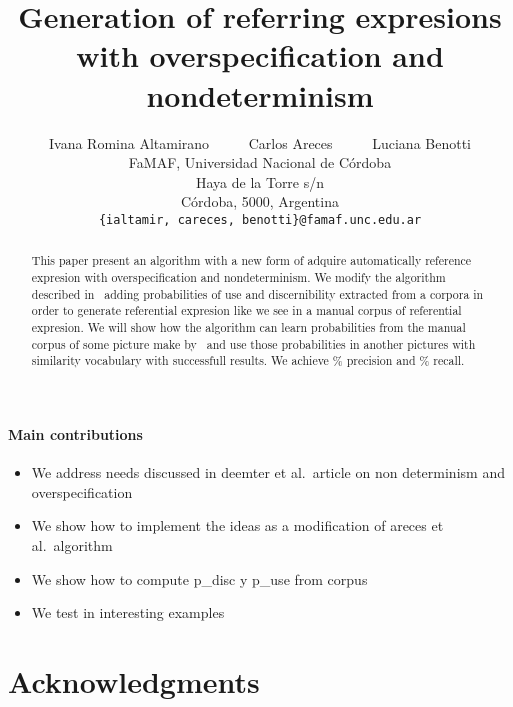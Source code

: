 \documentclass[11pt,letterpaper]{article}
\title{Generation of referring expresions with overspecification and nondeterminism}
\author{Ivana Romina Altamirano 
	  \ \ \ \ \ 
	Carlos Areces
	  \ \ \ \ \ 
	Luciana Benotti\\
	    FaMAF, Universidad Nacional de C\'ordoba\\
	    Haya de la Torre s/n\\
	    C\'ordoba, 5000, Argentina\\
	    	    {\tt \{ialtamir, careces, benotti\}@famaf.unc.edu.ar}	    }
\date{}
\newcommand{\pdisc}{\small \textsf{p\_disc}\xspace}
\newcommand{\puse}{\small \textsf{p\_use}\xspace}
\begin{document}
\maketitle
\begin{abstract}
  This paper present an algorithm with a new form of adquire automatically reference expresion with overspecification and nondeterminism. We modify the algorithm described in~\cite{arec2:2008:Areces} adding probabilities of use and discernibility extracted from a corpora in order to generate referential expresion like we see in a manual corpus of referential expresion. We will show how the algorithm can learn probabilities from the manual corpus of some picture make by~\cite{viethen-dale:2011:UCNLG+Eval} and use those probabilities in another pictures with similarity vocabulary with successfull results. We achieve \% precision and \% recall. 
\end{abstract}

\paragraph{Main contributions}
\begin{itemize}
\item We address needs discussed in deemter et al.\ article on non determinism and overspecification
\item We show how to implement the ideas as a modification of areces et al.\ algorithm
\item We show how to compute \pdisc y \puse from corpus
\item We test in interesting examples
\end{itemize}









\section*{Acknowledgments}



\end{document}
